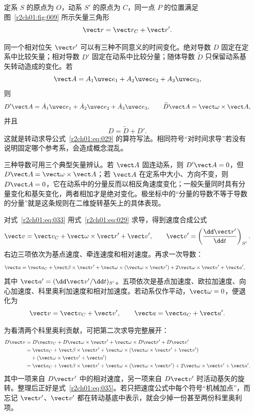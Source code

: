 定系 $S$ 的原点为 $O$，动系 $S'$ 的原点为 $C$，同一点 $P$ 的位置满足图~\ref{r2ch01:fig:009} 所示矢量三角形
\begin{equation}
  \vect r=\vect r_C+\vect r'.
  \label{r2ch01:eq:033}
\end{equation}

\figFrameTransform

同一个相对位矢 $\vect r'$ 可以有三种不同意义的时间变化。绝对导数 $D$ 固定在定系中比较矢量；相对导数 $D'$ 固定在动系中比较分量；随体导数 $\widetilde D$ 只保留动系基矢转动造成的变化。若
\[
  \vect A=A_1\uvec e_1+A_2\uvec e_2+A_3\uvec e_3,
\]
则
\[
  D'\vect A=\dot A_1\uvec e_1+\dot A_2\uvec e_2+\dot A_3\uvec e_3,
  \qquad
  \widetilde D\vect A=\vect\omega\times\vect A,
\]
并且
\[
  D=\widetilde D+D'.
\]
这就是转动求导公式~\eqref{r2ch01:eq:029} 的算符写法。相同符号“对时间求导”若没有说明固定哪个参考系，会造成概念混乱。

三种导数可用三个典型矢量辨认。若 $\vect A$ 固连动系，则 $D'\vect A=0$，但
$D\vect A=\vect\omega\times\vect A$；若 $\vect A$ 在定系中大小、方向不变，则 $D\vect A=0$，它在动系中的分量反而以相反角速度变化；一般矢量同时具有分量变化和基矢变化，两者相加才是绝对变化。极坐标中的“分量的导数不等于导数的分量”就是这条规则在二维旋转基矢上的具体表现。

对式~\eqref{r2ch01:eq:033} 用式~\eqref{r2ch01:eq:029} 求导，得到速度合成公式
\begin{equation}
  \vect v=\vect v_C+\vect\omega\times\vect r'+\vect v',
  \qquad
  \vect v'=\left(\frac{\dd\vect r'}{\dd t}\right)_{S'}.
  \label{r2ch01:eq:034}
\end{equation}
右边三项依次为基点速度、牵连速度和相对速度。再求一次导数：
\begin{align}
  \vect a={}&\vect a_C+\vect\beta\times\vect r'
  +\vect\omega\times(\vect\omega\times\vect r')
  +2\vect\omega\times\vect v'+\vect a',
  \label{r2ch01:eq:035}
\end{align}
其中 $\vect a'=(\dd\vect v'/\dd t)_{S'}$。五项依次是基点加速度、欧拉加速度、向心加速度、科里奥利加速度和相对加速度。若动系仅作平动，$\vect\omega=0$，便退化为
\begin{equation}
  \vect v=\vect v_C+\vect v',
  \qquad \vect a=\vect a_C+\vect a'.
  \label{r2ch01:eq:036}
\end{equation}

为看清两个科里奥利贡献，可把第二次求导完整展开：
\begin{align*}
  D\vect v
  &=
  D\vect v_C+D\vect\omega\times\vect r'
  +\vect\omega\times D\vect r'+D\vect v'\\
  &=
  \vect a_C+\vect\beta\times\vect r'
  +\vect\omega\times(\vect\omega\times\vect r'+\vect v')\\
  &\quad+(\vect\omega\times\vect v'+\vect a')\\
  &=\vect a_C+\vect\beta\times\vect r'
  +\vect\omega\times(\vect\omega\times\vect r')
  +2\vect\omega\times\vect v'+\vect a'.
\end{align*}
其中一项来自 $D\vect r'$ 中的相对速度，另一项来自 $D\vect v'$ 时活动基矢的旋转。整理后正好是式~\eqref{r2ch01:eq:035}。若只把速度公式中每个符号“机械加点”，而忘记 $\vect r'$、$\vect v'$ 都在转动基底中表示，就会少掉一份甚至两份科里奥利项。

